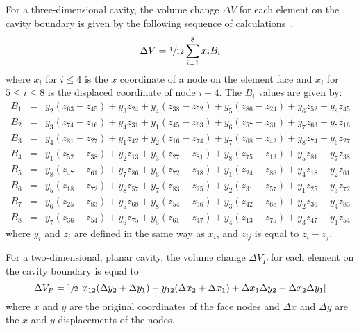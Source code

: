 For a three-dimensional cavity, the volume change $\Delta V$ for each
element on the cavity boundary is given by the following sequence of
calculations~\cite{PRONTO3D}. 
\begin{equation}
\Delta V = \sfrac{1}{12}\sum_{i=1}^8 x_i B_i
\end{equation}
where $x_i$ for $i\le 4$ is the $x$ coordinate of a node on the element
face and $x_i$ for $5 \le i\le 8$ is the displaced coordinate of node
$i-4$.  The $B_i$ values are given by:
\begin{eqnarray*}
B_{1} &=&   y_2 (z_{63}-z_{45}) + y_3 z_{24} + y_4 (z_{38}-z_{52})
          + y_5 (z_{86}-z_{24}) + y_6 z_{52} + y_8 z_{45} \\
B_{2} &=&   y_3 (z_{74}-z_{16}) + y_4 z_{31} + y_1 (z_{45}-z_{63})
          + y_6 (z_{57}-z_{31}) + y_7 z_{63} + y_5 z_{16} \\
B_{3} &=&   y_4 (z_{81}-z_{27}) + y_1 z_{42} + y_2 (z_{16}-z_{74})
          + y_7 (z_{68}-z_{42}) + y_8 z_{74} + y_6 z_{27} \\
B_{4} &=&   y_1 (z_{52}-z_{38}) + y_2 z_{13} + y_3 (z_{27}-z_{81})
          + y_8 (z_{75}-z_{13}) + y_5 z_{81} + y_7 z_{38} \\
B_{5} &=&   y_8 (z_{47}-z_{61}) + y_7 z_{86} + y_6 (z_{72}-z_{18})
          + y_1 (z_{24}-z_{86}) + y_4 z_{18} + y_2 z_{61} \\
B_{6} &=&   y_5 (z_{18}-z_{72}) + y_8 z_{57} + y_7 (z_{83}-z_{25})
          + y_2 (z_{31}-z_{57}) + y_1 z_{25} + y_3 z_{72} \\
B_{7} &=&   y_6 (z_{25}-z_{83}) + y_5 z_{68} + y_8 (z_{54}-z_{36})
          + y_3 (z_{42}-z_{68}) + y_2 z_{36} + y_4 z_{83} \\
B_{8} &=&   y_7 (z_{36}-z_{54}) + y_6 z_{75} + y_5 (z_{61}-z_{47})  
          + y_4 (z_{13}-z_{75}) + y_3 z_{47} + y_1 z_{54} 
\end{eqnarray*}
where $y_i$ and $z_i$ are defined in the same way as $x_i$, and $z_{ij}$
is equal to $z_i - z_j$.

For a two-dimensional, planar cavity, the volume change $\Delta V_P$ for
each element on the cavity boundary is equal to 
\begin{equation}
\Delta V_P = \sfrac{1}{2}\left[x_{12} (\Delta y_2 + \Delta y_1) - 
           y_{12} (\Delta x_2 + \Delta x_1) +
           \Delta x_1 \Delta y_2 -
           \Delta x_2 \Delta y_1\right] 
\end{equation}
where $x$ and $y$ are the original coordinates of the face nodes and 
$\Delta x$ and $\Delta y$ are the $x$ and $y$ displacements of the
nodes.

